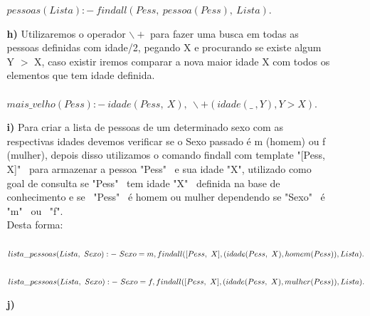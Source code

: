 \documentclass[12pt]{article}
\begin{document}
\begin{itemize}
\begin{itemize}
					$pessoas(Lista) :- \ findall(Pess, \ pessoa(Pess), \ Lista).$\\
				\item[\textbf{h) }]
					\hfill\newline
					Utilizaremos o operador $\backslash +$ para fazer uma busca em todas
					as pessoas definidas com idade/2, pegando X e procurando se existe
					algum Y $>$ X, caso existir iremos comparar a nova maior idade X com todos
					os elementos que tem idade definida.\\ \\
					$mais\_velho(Pess) :- \ idade(Pess, \ X), \ \backslash + (idade(\_ \ , Y), Y > X).$\\
				\item[\textbf{i) }]
					\hfill\newline
					Para criar a lista de pessoas de um determinado sexo com as respectivas idades devemos
					verificar se o Sexo passado é m (homem) ou f (mulher), depois disso utilizamos o comando
					findall com template "[Pess, X]" \ para armazenar a pessoa "Pess" \ e sua idade "X", 
					utilizado como goal de consulta se "Pess" \ tem idade "X" \ definida na base de 
					conhecimento e se \ "Pess" \ é homem ou mulher dependendo se "Sexo" \ é "m" \ ou
					\ "f".\\
					Desta forma:\\ \\
					$lista\_pessoas(Lista, \ Sexo) :- \ Sexo = m, \\ 
					findall([Pess, \ X], (idade(Pess, \ X), homem(Pess)), Lista).$\\ \\
					$lista\_pessoas(Lista, \ Sexo) :- \ Sexo = f, \\
					findall([Pess, \ X], (idade(Pess, \ X), mulher(Pess)), Lista).$\\
				\item[\textbf{j) }]
			\end{itemize}
	\end{itemize}
\end{document}
